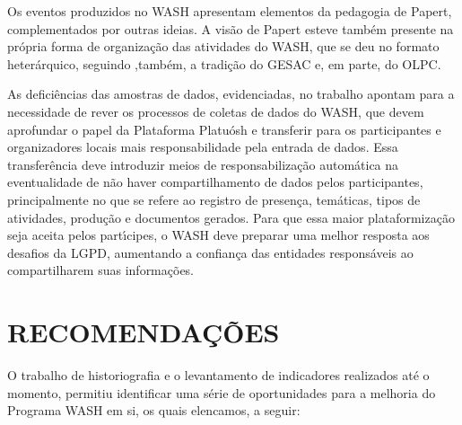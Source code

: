 \documentclass[
12pt,		%
openright,	%
twoside,  %
a4paper,			%
chapter=TITLE,		%
english,			%
french,				%
spanish,			%
brazil				%
]{USPSC-classe/USPSC}
\begin{document}
\begin{alineas}
\item Os eventos produzidos no WASH apresentam elementos da pedagogia de Papert, complementados por outras ideias. A vis\~ao de Papert esteve tamb\'em presente na pr\'opria forma de organiza\c{c}\~ao das atividades do WASH, que se deu no formato heter\'arquico, seguindo ,tamb\'em, a tradi\c{c}\~ao do GESAC e, em parte, do OLPC.
\item As defici\^encias das amostras de dados, evidenciadas, no trabalho apontam para a necessidade de rever os processos de coletas de dados do WASH, que devem aprofundar o papel da Plataforma Platu\'osh e transferir para os participantes e organizadores locais mais responsabilidade pela entrada de dados. Essa transfer\^encia deve introduzir meios de responsabiliza\c{c}\~ao autom\'atica na eventualidade de n\~ao haver compartilhamento de dados pelos participantes, principalmente no que se refere ao registro de presen\c{c}a, tem\'aticas, tipos de atividades, produ\c{c}\~ao e documentos gerados. Para que essa maior plataformiza\c{c}\~ao seja aceita pelos part\'{\i}cipes, o WASH deve preparar uma melhor resposta aos desafios da LGPD, aumentando a confian\c{c}a das entidades respons\'aveis ao compartilharem suas informa\c{c}\~oes.
\end{alineas}

\chapter[RECOMENDA\c{C}\~OES]{RECOMENDA\c{C}\~OES}\label{RECOMENDA\c{C}\~OES}
O trabalho de historiografia  e o levantamento de indicadores realizados at\'e o momento, permitiu identificar uma s\'erie de oportunidades para a melhoria do Programa WASH em si, os quais elencamos, a seguir:
\end{document}
